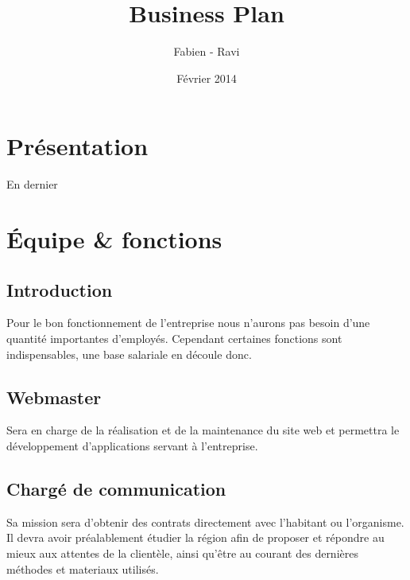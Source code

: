 \documentclass[10pt]{article}
\title{\textbf{Business Plan}\\{ {\small {\bsc {- Res Publica -}}}}}
\author{Fabien \bsc{Buisson} - Ravi \bsc{Pachy}}
\date{Février 2014}
\begin{document}
\renewcommand{\contentsname}{Sommaire}
\maketitle
\thispagestyle{empty}

\newpage

\tableofcontents

\newpage
\pagestyle{headings}

\section{Présentation}
\label{sec:presentation}
En dernier



\section{Équipe \& fonctions}
\label{sec:equipe_fonctions}

\subsection{Introduction}
\label{sub:equipe_intro}
Pour le bon fonctionnement de l'entreprise nous n'aurons pas besoin d'une quantité importantes d'employés. Cependant certaines fonctions sont indispensables, une base salariale en découle donc.

\subsection{Webmaster}
\label{sec:webmaster}
Sera en charge de la réalisation et de la maintenance du site web et permettra le développement d'applications servant à l'entreprise.


\subsection{Chargé de communication}
\label{sec:communication}
Sa mission sera d'obtenir des contrats directement avec l'habitant ou l'organisme. Il devra avoir préalablement étudier la région afin de proposer et répondre au mieux aux attentes de la clientèle, ainsi qu'être au courant des dernières méthodes et materiaux utilisés.

\end{document}
